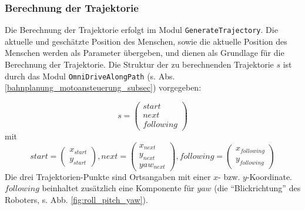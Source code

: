 \subsubsection{Berechnung der Trajektorie}

Die Berechnung der Trajektorie erfolgt im Modul \lstinline{GenerateTrajectory}.
Die aktuelle und geschätzte Position des Menschen, sowie die aktuelle Position des Menschen werden als Parameter übergeben, und dienen als Grundlage für die Berechnung der Trajektorie.
Die Struktur der zu berechnenden Trajektorie $s$ ist durch das Modul \lstinline{OmniDriveAlongPath} (s. Abs. \ref{bahnplanung_motoansteuerung_subsec}) vorgegeben:

% 

\begin{equation}
	s =	\begin{pmatrix} start \\ next \\ following \end{pmatrix}
\end{equation}
mit 
\begin{equation}
	start = 		\begin{pmatrix}	x_{start} \\ y_{start}							\end{pmatrix},
	next = 			\begin{pmatrix} x_{next} \\ y_{next} \\ yaw_{next}	\end{pmatrix},
	following =	\begin{pmatrix}	x_{following} \\ y_{following}							\end{pmatrix}
\end{equation}
Die drei Trajektorien-Punkte sind Ortsangaben mit einer $x$- bzw. $y$-Koordinate.
$following$ beinhaltet zusätzlich eine Komponente für $yaw$ (die ``Blickrichtung'' des Roboters, s. Abb. \ref{fig:roll_pitch_yaw}).

